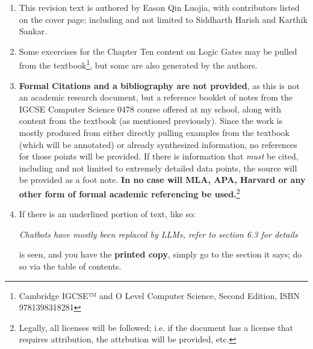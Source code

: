 \documentclass[../main.tex]{subfiles}
\begin{document}
\begin{enumerate}

\item This revision text is authored by Eason Qin Luojia, with contributors listed on the cover page; including and not limited to Siddharth Harish and Karthik Sankar.

\item Some excercises for the Chapter Ten content on Logic Gates may be pulled from the textbook\footnote{Cambridge IGCSE™ and O Level Computer Science, Second Edition, ISBN 9781398318281}, but some are also generated by the authors.

\item \textbf{Formal Citations and a bibliography are not provided}, as this is not an academic research document, but a reference booklet of notes from the IGCSE Computer Science 0478 course offered at my school, along with content from the textbook (as mentioned previously). Since the work is mostly produced from either directly pulling examples from the textbook (which will be annotated) or already synthesized information, no references for those points will be provided. If there is information that \textit{must} be cited, including and not limited to extremely detailed data points, the source will be provided as a foot note. \textbf{In no case will MLA, APA, Harvard or any other form of formal academic referencing be used.}\footnote{Legally, all licenses will be followed; i.e. if the document has a license that requires attribution, the attrbution will be provided, etc.}

\item If there is an underlined portion of text, like so:

      \textit{Chatbots have mostly been replaced by LLMs, refer to section 6.3 for details}

      is seen, and you have the \textbf{printed copy}, simply go to the section it says; do so via the table of contents.

\end{enumerate}
\end{document}
